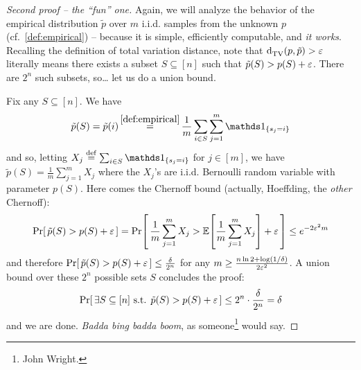 \documentclass[10pt]{article}
\begin{document}
\begin{proof}[Second proof -- the ``fun'' one]
Again, we will analyze the behavior of the empirical distribution $\tilde{p}$ over $m$ i.i.d. samples from the unknown $p$ (cf.~\eqref{def:empirical}) -- because it is simple, efficiently computable, and \emph{it works}.  Recalling the definition of total variation distance, note that ${\operatorname{d}_{\rm TV}^{}\!\left({p, \tilde{p}}\right)} > \varepsilon$ literally means there exists a subset $S\subseteq [n]$ such that $\tilde{p}(S) > p(S) + \varepsilon$. There are $2^n$ such subsets, so\dots{} let us do a union bound.

Fix any $S\subseteq[n]$. We have
\[
\tilde{p}(S) = \tilde{p}(i) \operatorname*{=}^{\eqref{def:empirical}} \frac{1}{m} \sum_{i\in S} \sum_{j=1}^m \indic{s_j=i}
\]
and so, letting $X_j \eqdef \sum_{i\in S}\indic{s_j=i}$ for $j\in [m]$, we have
$
\tilde{p}(S) = \frac{1}{m}\sum_{j=1}^m X_j
$ where the $X_j$'s are i.i.d. Bernoulli random variable with parameter $p(S)$. Here comes the Chernoff bound (actually, Hoeffding, the \emph{other} Chernoff):
\[
    \Pr\!\left[\,  \tilde{p}(S) > p(S) + \varepsilon \, \right] = \Pr\!\left[\,  \frac{1}{m}\sum_{j=1}^m X_j > \mathbb{E}\!\left[\frac{1}{m}\sum_{j=1}^m X_j\right] + \varepsilon \, \right] \leq e^{-2\varepsilon^2 m}
\]
and therefore $\Pr\!\left[\,  \tilde{p}(S) > p(S) + \varepsilon \, \right] \leq \frac{\delta}{2^n}$ for any $m\geq \frac{n\ln 2+\log(1/\delta)}{2\varepsilon^2}$. A union bound over these $2^n$ possible sets $S$ concludes the proof:
\[
    \Pr\!\left[\,  \exists S\subseteq [n] \text{ s.t. }\tilde{p}(S) > p(S) + \varepsilon \, \right] \leq 2^n\cdot \frac{\delta}{2^n} = \delta
\]
and we are done. \emph{Badda bing badda boom}, as someone\footnote{John Wright.} would say.


%
%
%
%
\end{proof}
\end{document}
